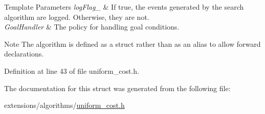\begin{DoxyTemplParams}{Template Parameters}
{\em log\+Flag\+\_\+} & If {\ttfamily true}, the events generated by the search algorithm are logged. Otherwise, they are not. \\
\hline
{\em Goal\+Handler} & The policy for handling goal conditions. \\
\hline
\end{DoxyTemplParams}
\begin{DoxyNote}{Note}
The algorithm is defined as a struct rather than as an alias to allow forward declarations. 
\end{DoxyNote}


Definition at line 43 of file uniform\+\_\+cost.\+h.



The documentation for this struct was generated from the following file\+:\begin{DoxyCompactItemize}
\item 
extensions/algorithms/\hyperlink{uniform__cost_8h}{uniform\+\_\+cost.\+h}\end{DoxyCompactItemize}
